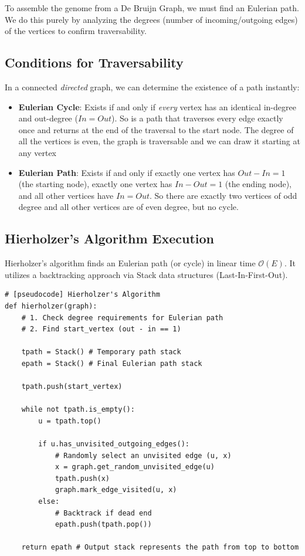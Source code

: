 To assemble the genome from a De Bruijn Graph, we must find an Eulerian path. We do this purely by analyzing the degrees (number of incoming/outgoing edges) of the vertices to confirm traversability.

\subsection{Conditions for Traversability}
In a connected \textit{directed} graph, we can determine the existence of a path instantly:
\begin{itemize}
    \item \textbf{Eulerian Cycle}: Exists if and only if \textit{every} vertex has an identical in-degree and out-degree ($In = Out$). 
    So is a path that traverses every edge exactly once and returns at the end of the traversal to the start node. The degree of all the vertices is even, the graph is traversable and we can
draw it starting at any vertex
    \item \textbf{Eulerian Path}: Exists if and only if exactly one vertex has $Out - In = 1$ (the starting node), exactly one vertex has $In - Out = 1$ (the ending node), and all other vertices have $In = Out$.
    So there are exactly two vertices of odd degree and all other vertices are of even degree, but no cycle.
\end{itemize}

\subsection{Hierholzer's Algorithm Execution}
Hierholzer's algorithm finds an Eulerian path (or cycle) in linear time $\mathcal{O}(E)$. It utilizes a backtracking approach via Stack data structures (Last-In-First-Out).

\begin{verbatim}
# [pseudocode] Hierholzer's Algorithm
def hierholzer(graph):
    # 1. Check degree requirements for Eulerian path
    # 2. Find start_vertex (out - in == 1)

    tpath = Stack() # Temporary path stack
    epath = Stack() # Final Eulerian path stack

    tpath.push(start_vertex)

    while not tpath.is_empty():
        u = tpath.top()

        if u.has_unvisited_outgoing_edges():
            # Randomly select an unvisited edge (u, x)
            x = graph.get_random_unvisited_edge(u)
            tpath.push(x)
            graph.mark_edge_visited(u, x)
        else:
            # Backtrack if dead end
            epath.push(tpath.pop())

    return epath # Output stack represents the path from top to bottom
\end{verbatim}

